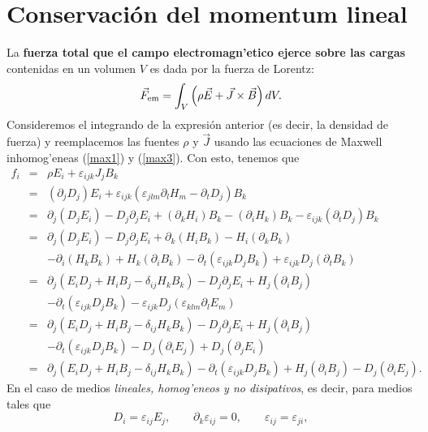 \section{Conservación del momentum lineal}\label{sec:momentum}
La \textbf{fuerza total que el campo electromagn'etico ejerce sobre las cargas} contenidas en un volumen $V$ es dada por la fuerza de Lorentz:
\begin{equation}
\vec{F}_{\rm em}=\int_V\left(\rho\vec{E}+\vec{J}\times\vec{B}\right)dV .
\end{equation}
Consideremos el integrando de la expresión anterior (es decir, la densidad de fuerza) y reemplacemos las fuentes $\rho$ y $\vec{J}$ usando las ecuaciones de Maxwell inhomog'eneas (\ref{max1}) y (\ref{max3}). Con esto, tenemos que
\begin{eqnarray}
f_i&=&\rho E_i+\varepsilon_{ijk}J_jB_k \\
&=&(\partial_jD_j)E_i+\varepsilon_{ijk}(\varepsilon_{
jlm}\partial_lH_m-\partial_tD_j)B_k  \\
&=& \partial_j(D_jE_i)-D_j\partial_jE_i +
(\partial_kH_i)B_k-(\partial_iH_k)B_k-\varepsilon_{ijk}(\partial_tD_j)B_k \\
&=& \partial_j(D_jE_i)-D_j\partial_jE_i +
\partial_k(H_iB_k)-H_i(\partial_kB_k) \nonumber\\
&& -\partial_i(H_kB_k)+H_k(\partial_iB_k)
-\partial_t(\varepsilon_{ijk} D_jB_k)
+\varepsilon_{ijk} D_j(\partial_tB_k) \\
&=&\partial_j(E_iD_j+H_iB_j-\delta_{ij}H_kB_k)
-D_j\partial_jE_i+H_j(\partial_iB_j) \nonumber\\
&& -\partial_t(\varepsilon_{ijk}
D_jB_k)-\varepsilon_{ijk} D_j(\varepsilon_{klm}\partial_lE_m) \\
&=&\partial_j(E_iD_j+H_iB_j-\delta_{ij}H_kB_k)
-D_j\partial_jE_i+H_j(\partial_iB_j) \nonumber\\
&& -\partial_t(\varepsilon_{ijk} D_jB_k)-D_j(\partial_iE_j) +D_j(\partial_jE_i)\\
&=&\partial_j(E_iD_j+H_iB_j-\delta_{ij}H_kB_k)-\partial_t(\varepsilon_{ijk}
D_jB_k)+H_j(\partial_iB_j)- D_j(\partial_iE_j). \label{flc}
\end{eqnarray}
En el caso de medios \textit{lineales, homog'eneos y no disipativos}, es decir, para medios tales que
\begin{equation}
 D_i=\varepsilon_{ij}E_j, \qquad \partial_k\varepsilon_{ij}=0, \qquad \varepsilon_{ij}=\varepsilon_{ji},
\end{equation}
